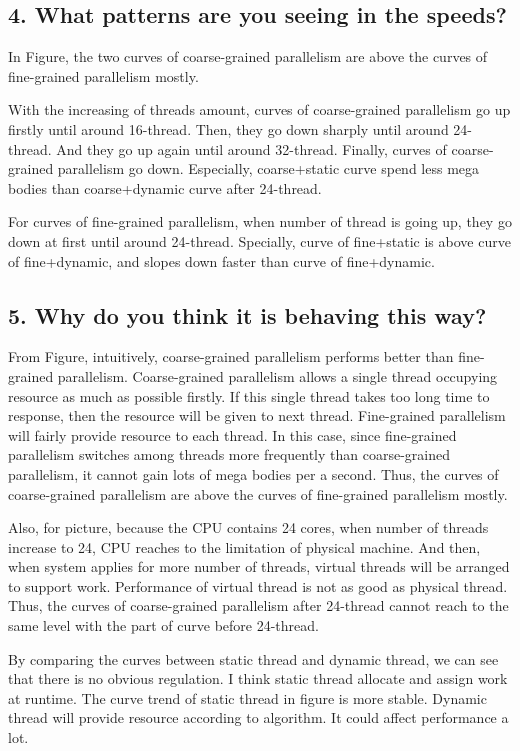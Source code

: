 \documentclass[a4paper,12pt]{article}
\begin{document}
\subsection*{4. What patterns are you seeing in the speeds?}

In Figure, the two curves of coarse-grained parallelism are above the curves of fine-grained parallelism mostly.

With the increasing of threads amount, curves of coarse-grained parallelism go up firstly until around 16-thread. Then, they go down sharply until around 24-thread. And they go up again until around 32-thread. Finally, curves of coarse-grained parallelism go down. Especially, coarse+static curve spend less mega bodies than coarse+dynamic curve after 24-thread.

For curves of fine-grained parallelism, when number of thread is going up, they go down at first until around 24-thread. Specially, curve of fine+static is above curve of fine+dynamic, and slopes down faster than curve of fine+dynamic.

\subsection*{5. Why do you think it is behaving this way?}

From Figure, intuitively, coarse-grained parallelism performs better than fine-grained parallelism. Coarse-grained parallelism allows a single thread occupying resource as much as possible firstly. If this single thread takes too long time to response, then the resource will be given to next thread. Fine-grained parallelism will fairly provide resource to each thread. In this case, since fine-grained parallelism switches among threads more frequently than coarse-grained parallelism, it cannot gain lots of mega bodies per a second. Thus, the curves of coarse-grained parallelism are above the curves of fine-grained parallelism mostly.

Also, for picture, because the CPU contains 24 cores, when number of threads increase to 24, CPU reaches to the limitation of physical machine. And then, when system applies for more number of threads, virtual threads will be arranged to support work. Performance of virtual thread is not as good as physical thread. Thus, the curves of coarse-grained parallelism after 24-thread cannot reach to the same level with the part of curve before 24-thread.

By comparing the curves between static thread and dynamic thread, we can see that there is no obvious regulation. I think static thread allocate and assign work at runtime. The curve trend of static thread in figure is more stable. Dynamic thread will provide resource according to algorithm. It could affect performance a lot.
\end{document}
